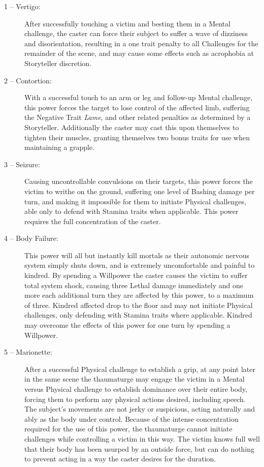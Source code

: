 \begin{description}
	\item[1 -- Vertigo:]  After successfully touching a victim and besting them in a Mental challenge, the caster 
	can force their subject to suffer a wave of dizziness and disorientation, resulting in a one trait penalty to 
	all Challenges for the remainder of the scene, and may cause some effects such as acrophobia at Storyteller 
	discretion.
	\item[2 -- Contortion:]  With a successful touch to an arm or leg and follow-up Mental challenge, this power 
	forces the target to lose control of the affected limb, suffering the Negative Trait \emph{Lame}, and other 
	related penalties as determined by a Storyteller.  Additionally the caster may cast this upon themselves to 
	tighten their muscles, granting themselves two bonus traits for use when maintaining a grapple.
	\item[3 -- Seizure:]  Causing uncontrollable convulsions on their targets, this power forces the victim to 
	writhe on the ground, suffering one level of Bashing damage per turn, and making it impossible for them to 
	initiate Physical challenges, able only to defend with Stamina traits when applicable.  This power requires 
	the full concentration of the caster.
	\item[4 -- Body Failure:]  This power will all but instantly kill mortals as their autonomic nervous system 
	simply shuts down, and is extremely uncomfortable and painful to kindred.  By spending a Willpower the 
	caster causes the victim to suffer total system shock, causing three Lethal damage immediately and one more 
	each additional turn they are affected by this power, to a maximum of three.  Kindred affected drop to the 
	floor and may not initiate Physical challenges, only defending with Stamina traits where applicable.  Kindred 
	may overcome the effects of this power for one turn by spending a Willpower.
	\item[5 -- Marionette:]  After a successful Physical challenge to establish a grip, at any point later in the 
	same scene the thaumaturge may engage the victim in a Mental versus Physical challenge to establish dominance 
	over their entire body, forcing them to perform any physical actions desired, including speech.  The subject's 
	movements are not jerky or suspicious, acting naturally and ably as the body under control.  Because of the 
	intense concentration required for the use of this power, the thaumaturge cannot initiate challenges while 
	controlling a victim in this way.  The victim knows full well that their body has been usurped by an outside 
	force, but can do nothing to prevent acting in a way the caster desires for the duration.
\end{description}

